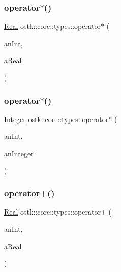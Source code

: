 \subsubsection{\texorpdfstring{operator$\ast$()}{operator*()}\hspace{0.1cm}{\footnotesize\ttfamily [1/2]}}
{\footnotesize\ttfamily \hyperlink{classostk_1_1core_1_1types_1_1_real}{Real} ostk\+::core\+::types\+::operator$\ast$ (\begin{DoxyParamCaption}\item[{const \hyperlink{classostk_1_1core_1_1types_1_1_real_aa26f796c30b514c98d573f82e3b02296}{Real\+::\+Value\+Type} \&}]{an\+Int,  }\item[{const \hyperlink{classostk_1_1core_1_1types_1_1_real}{Real} \&}]{a\+Real }\end{DoxyParamCaption})}

\mbox{\label{namespaceostk_1_1core_1_1types_acf43a4f86a3c4d7b7dca0686b4ee6561}} 
\subsubsection{\texorpdfstring{operator$\ast$()}{operator*()}\hspace{0.1cm}{\footnotesize\ttfamily [2/2]}}
{\footnotesize\ttfamily \hyperlink{classostk_1_1core_1_1types_1_1_integer}{Integer} ostk\+::core\+::types\+::operator$\ast$ (\begin{DoxyParamCaption}\item[{const \hyperlink{classostk_1_1core_1_1types_1_1_integer_a76a5f41f78659f116eafaf26cecc3244}{Integer\+::\+Value\+Type} \&}]{an\+Int,  }\item[{const \hyperlink{classostk_1_1core_1_1types_1_1_integer}{Integer} \&}]{an\+Integer }\end{DoxyParamCaption})}

\mbox{\label{namespaceostk_1_1core_1_1types_ac43962c2fa806c2b6ae3d50dad865c9d}} 
\subsubsection{\texorpdfstring{operator+()}{operator+()}\hspace{0.1cm}{\footnotesize\ttfamily [1/2]}}
{\footnotesize\ttfamily \hyperlink{classostk_1_1core_1_1types_1_1_real}{Real} ostk\+::core\+::types\+::operator+ (\begin{DoxyParamCaption}\item[{const \hyperlink{classostk_1_1core_1_1types_1_1_real_aa26f796c30b514c98d573f82e3b02296}{Real\+::\+Value\+Type} \&}]{an\+Int,  }\item[{const \hyperlink{classostk_1_1core_1_1types_1_1_real}{Real} \&}]{a\+Real }\end{DoxyParamCaption})}

